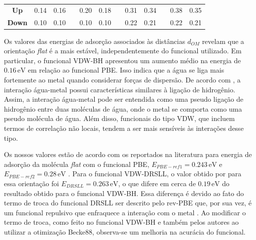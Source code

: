 \begin{table}[b!]
\begin{tabular}{cccccccccccc}
 		\textbf{Up}                & 0.14      & 0.16 &  & 0.20      & 0.18                     &  &    0.31  &           0.34           &  &     0.38  &              0.35         \\ 
 		
 		\textbf{Down}              & 0.10      &            0.10          &  & 0.10      &              0.10        &  &    0.22  &    0.21                  &  &    0.22  &        0.21               \\
 		\hline\hline
 	\end{tabular}
 \end{table}
 
Os valores das energias de adsorção associados às distâncias $ d_{OM} $ revelam que a orientação \textit{flat} é a mais estável, independentemente do funcional utilizado. Em particular, o funcional VDW-BH apresentou um aumento médio na energia de $ 0.16\,\si{\eV} $ em relação ao funcional PBE. Isso indica que a água se liga mais fortemente ao metal quando considerar forças de dispersão. De acordo com \citeauthor{adrien}, a interação água-metal possui características similares à ligação de hidrogênio. Assim, a interação água-metal pode ser entendida como uma pseudo ligação de hidrogênio entre duas moléculas de água, onde o metal se comporta como uma pseudo molécula de água. Além disso, funcionais do tipo VDW, que incluem termos de correlação não locais, tendem a ser mais sensíveis às interações desse tipo.   

Os nossos valores estão de acordo com os reportados na literatura para energia de adsorção da molécula \textit{flat} com o funcional PBE, $ E_{PBE-ref1}=0.243\,\si{\eV} $ \cite{vdw-func} e $ E_{PBE-ref2}=0.28 \,\si{\eV} $ \cite{adrien}. Para o funcional VDW-DRSLL, o valor obtido por \citeauthor{adrien} para essa orientação foi $ E_{DRSLL}=0.263\,\si{\eV} $, o que difere em cerca de $ 0.19\,\si{\eV} $ do resultado obtido para o funcional VDW-BH. Essa diferença é devido ao fato do termo de troca do funcional DRSLL ser descrito pelo rev-PBE que, por sua vez, é um funcional repulsivo que enfraquece a interação com o metal \cite{adrien}. Ao modificar o termo de troca, como feito no funcional VDW-BH e também pelos autores \citeauthor{vdw-func} ao utilizar a otimização Becke88, observa-se um melhoria na acurácia do funcional.

